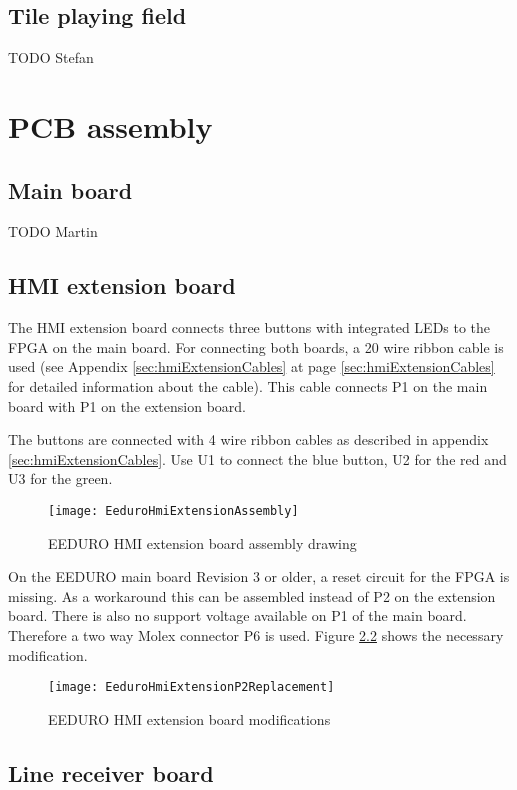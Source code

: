 \section{Tile playing field}
TODO Stefan

\chapter{PCB assembly}
\section{Main board}
TODO Martin

\section{HMI extension board}

The HMI extension board connects three buttons with integrated LEDs to the FPGA on the main board. For connecting both boards, a 20 wire ribbon cable is used (see Appendix \ref{sec:hmiExtensionCables} at page \ref{sec:hmiExtensionCables} for detailed information about the cable). This cable connects P1 on the main board with P1 on the extension board.

The buttons are connected with 4 wire ribbon cables as described in appendix \ref{sec:hmiExtensionCables}. Use U1 to connect the blue button, U2 for the red and U3 for the green.

\begin{figure}[htbp]
	\centering
	\texttt{[image: EeduroHmiExtensionAssembly]}
	\caption{EEDURO HMI extension board assembly drawing}
	\label{fig:EeduroHmiExtensionAssembly}
\end{figure}

On the EEDURO main board Revision 3 or older, a reset circuit for the FPGA is missing. As a workaround this can be assembled instead of P2 on the extension board. There is also no support voltage available on P1 of the main board. Therefore a two way Molex connector P6 is used. Figure \ref{fig:EeduroHmiExtensionP2Replacement} shows the necessary modification.

\begin{figure}[htbp]
	\centering
	\texttt{[image: EeduroHmiExtensionP2Replacement]}
	\caption{EEDURO HMI extension board modifications}
	\label{fig:EeduroHmiExtensionP2Replacement}
\end{figure}

\section{Line receiver board}

